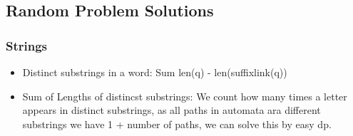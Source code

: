         \subsection{Random Problem Solutions}
        \subsubsection{Strings}
        \begin{itemize}
        \item Distinct substrings in a word: Sum len(q) - len(suffixlink(q))
        \item Sum of Lengths of distincst substrings: We count how many times a letter appears in distinct substrings, as all paths in automata ara different substrings we have 1 + number of paths, we can solve this by easy dp.  
        \end{itemize}
        
        